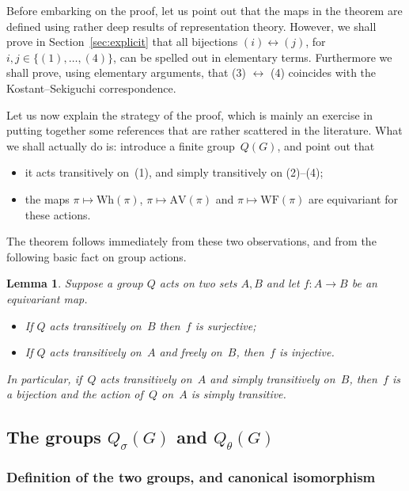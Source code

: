 \documentclass[10pt,leqno]{article}
\newtheorem{lemma}[equation]{Lemma}
\newcommand{\AV}{\mathrm{AV}}
\newcommand{\Wh}{\mathrm{Wh}}
\newcommand{\WF}{\mathrm{WF}}
\begin{document}
Before embarking on the proof, let us point out that the maps in the theorem are defined using rather deep results of representation theory. However, we shall prove in Section~\ref{sec:explicit} that all bijections $(i) \leftrightarrow (j)$, for $i,j \in \{(1), \dots, (4)\}$, can be spelled out in elementary terms. Furthermore we shall prove, using elementary arguments, that (3) $\leftrightarrow$ (4) coincides with the Kostant--Sekiguchi correspondence.  



Let us now explain the strategy of the proof, which is mainly an exercise in putting together some references that are rather scattered in the literature. What we shall actually do is: introduce a finite group~$Q(G)$, and point out that 
\begin{itemize}
\item[(i)] it acts transitively on~(1), and simply transitively on (2)--(4);
\item[(ii)] the maps $\pi \mapsto \Wh(\pi)$, $\pi \mapsto \AV(\pi)$ and $\pi\mapsto \WF(\pi)$  are equivariant for these actions.
\end{itemize}
The theorem follows immediately from these two observations, and from the following basic fact on group actions.

\begin{lemma} Suppose a group $Q$ acts on two sets $A, B$ and let $f\colon A \to B$ be an equivariant map. 
\begin{itemize}
\item[(a)] If $Q$ acts transitively on~$B$  then~$f$ is surjective;
\item[(b)] If $Q$ acts transitively on~$A$ and freely on~$B$, then~$f$ is injective.
\end{itemize}
In particular, if~$Q$ acts transitively on~$A$ and simply transitively on~$B$, then~$f$ is a bijection and the action of~$Q$ on~$A$ is simply transitive.
\end{lemma}

\subsection{The groups $Q_\sigma(G)$ and $Q_{\theta}(G)$}

\subsubsection{Definition of the two groups, and canonical isomorphism}
\end{document}

